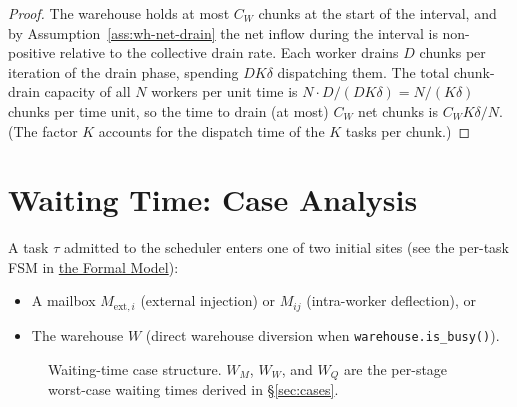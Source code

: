 \documentclass[11pt,a4paper]{report}
\newcommand{\code}[1]{\texttt{#1}}
\begin{document}
\begin{proof}
The warehouse holds at most $C_W$ chunks at the start of the interval,
and by Assumption~\ref{ass:wh-net-drain} the net inflow during the
interval is non-positive relative to the collective drain rate. Each
worker drains $D$ chunks per iteration of the drain phase, spending
$DK\delta$ dispatching them.  The total chunk-drain capacity of all $N$
workers per unit time is $N \cdot D / (DK\delta) = N/(K\delta)$
chunks per time unit, so the time to drain (at most) $C_W$ net chunks
is $C_W K\delta / N$.  (The factor $K$ accounts for the dispatch
time of the $K$ tasks per chunk.)
\end{proof}

\section{Waiting Time: Case Analysis}

A task $\tau$ admitted to the scheduler enters one of two
initial sites (see the per-task FSM in \hyperref[chap:formal_model]{the Formal Model}):
\begin{itemize}
  \item A mailbox $M_{\text{ext},i}$ (external injection) or
        $M_{ij}$ (intra-worker deflection), or
  \item The warehouse $W$ (direct warehouse diversion when
        \code{warehouse.is\_busy()}).
\end{itemize}

\begin{figure}[h]
\centering
{}
\caption{Waiting-time case structure.  $W_M$, $W_W$, and $W_Q$ are
the per-stage worst-case waiting times derived in \S\ref{sec:cases}.}
\label{fig:wait}
\end{figure}
\end{document}
